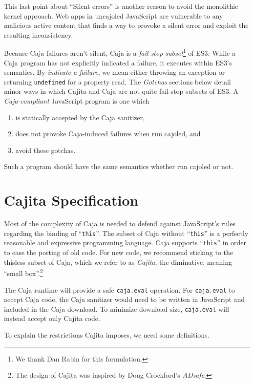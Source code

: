 \documentclass[letterpaper,twocolumn,10pt]{article}
\newcommand{\code}[1]{{\tt {#1}}}              %
\begin{document}
This last point about ``Silent errors'' is another reason to avoid the 
monolithic kernel approach. Web apps in uncajoled JavaScript are vulnerable 
to any malicious active content that finds a way to provoke a silent error 
and exploit the resulting inconsistency.

Because Caja failures aren't silent, Caja is a \emph{fail-stop 
subset}\footnote{
%
We thank Dan Rabin for this formulation.
%
} of ES3: While a Caja program has not explicitly indicated a failure, it 
executes within ES3's semantics. By \emph{indicate a failure}, we mean either 
throwing an exception or returning \code{undefined} for a property read. The 
\emph{Gotchas} sections below detail minor ways in which Cajita and Caja are 
not quite fail-stop subsets of ES3. A \emph{Caja-compliant} JavaScript 
program is one which
\begin{enumerate}
  \item is statically accepted by the Caja sanitizer,
  \item does not provoke Caja-induced failures when run cajoled, and
  \item avoid these gotchas.
\end{enumerate}
Such a program should have the same semantics whether run cajoled or not.


\section{Cajita Specification}
\label{sec:cajita-spec}

Most of the complexity of Caja is needed to defend against JavaScript's rules 
regarding the binding of ``\code{this}''. The subset of Caja without 
``\code{this}'' is a perfectly reasonable and expressive programming 
language. Caja supports ``\code{this}'' in order to ease the porting of old 
code. For new code, we recommend sticking to the thisless subset of Caja, 
which we refer to as \emph{Cajita}, the diminutive, meaning ``small 
box''.\footnote{
%
The design of Cajita was inspired by Doug Crockford's \emph{ADsafe}.
%
}

The Caja runtime will provide a safe \code{caja.eval} operation. For 
\code{caja.eval} to accept Caja code, the Caja sanitizer would need to be 
written in JavaScript and included in the Caja download. To minimize download 
size, \code{caja.eval} will instead accept only Cajita code.

To explain the restrictions Cajita imposes, we need some definitions.
\end{document}
